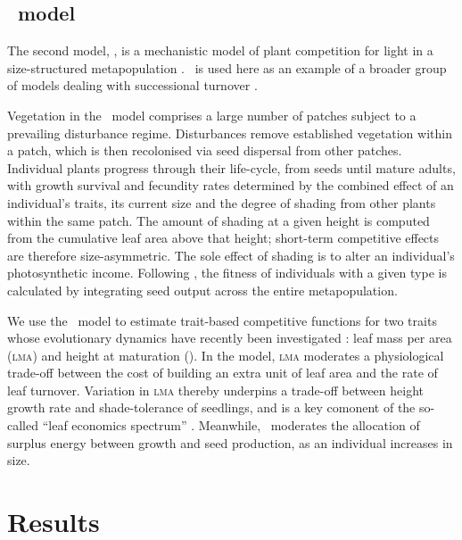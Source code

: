 \documentclass[a4paper,11pt]{article}
\begin{document}
\subsection{\plant\ model}

The second model, \plant, is a mechanistic model of plant competition
for light in a size-structured metapopulation \citep{Falster-2011,
  Falster-2015}. \plant\ is used here as an example of a broader group
of models dealing with successional turnover
\citep{Huston-1987,Kohyama-1993,Moorcroft-2001,Falster-2011}.

Vegetation in the \plant\ model comprises a large number of patches subject
to a prevailing disturbance regime.  Disturbances remove established
vegetation within a patch, which is then recolonised via seed
dispersal from other patches.  Individual plants progress through
their life-cycle, from seeds until mature adults, with growth survival
and fecundity rates determined by the combined effect of an
individual's traits, its current size and the degree of shading from
other plants within the same patch. The amount of shading at a given
height is computed from the cumulative leaf area above that height;
short-term competitive effects are therefore size-asymmetric. The sole
effect of shading is to alter an individual's photosynthetic
income. Following \citep{Falster-2015}, the fitness of individuals
with a given type is calculated by integrating seed output across the
entire metapopulation.

We use the \plant\ model to estimate trait-based competitive functions
for two traits whose evolutionary dynamics have recently been
investigated \citep{Falster-2015}: leaf mass per area (\textsc{lma})
and height at maturation (\hmat). In the model, \textsc{lma} moderates
a physiological trade-off between the cost of building an extra unit
of leaf area and the rate of leaf turnover.  Variation in \textsc{lma}
thereby underpins a trade-off between height growth rate and
shade-tolerance of seedlings, and is a key comonent of the so-called
``leaf economics spectrum'' \citep{Wright-2004}. Meanwhile, \hmat\
moderates the allocation of surplus energy between growth and seed
production, as an individual increases in size.


\section{Results}
\end{document}
